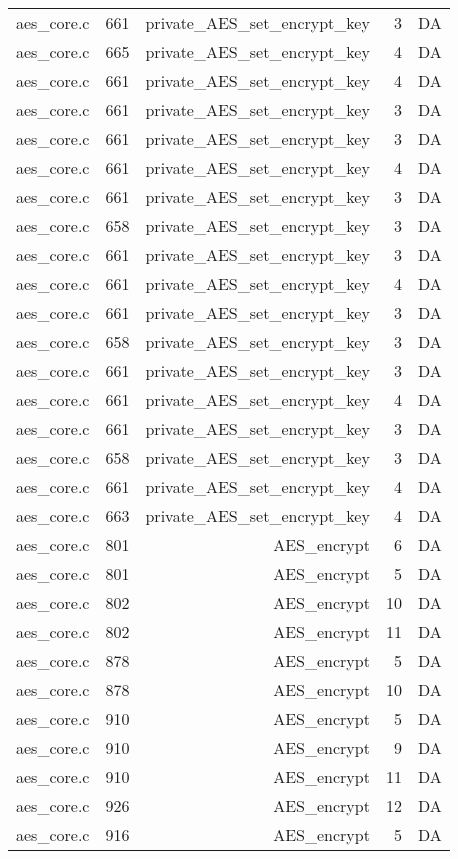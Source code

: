 \begin{table}
\begin{tabular}{clrrr}
aes\_core.c& 661&private\_AES\_set\_encrypt\_key&3 &DA\\
aes\_core.c& 665&private\_AES\_set\_encrypt\_key&4 &DA\\
aes\_core.c& 661&private\_AES\_set\_encrypt\_key&4 &DA\\
aes\_core.c& 661&private\_AES\_set\_encrypt\_key&3 &DA\\
aes\_core.c& 661&private\_AES\_set\_encrypt\_key&3 &DA\\
aes\_core.c& 661&private\_AES\_set\_encrypt\_key&4 &DA\\
aes\_core.c& 661&private\_AES\_set\_encrypt\_key&3 &DA\\
aes\_core.c& 658&private\_AES\_set\_encrypt\_key&3 &DA\\
aes\_core.c& 661&private\_AES\_set\_encrypt\_key&3 &DA\\
aes\_core.c& 661&private\_AES\_set\_encrypt\_key&4 &DA\\
aes\_core.c& 661&private\_AES\_set\_encrypt\_key&3 &DA\\
aes\_core.c& 658&private\_AES\_set\_encrypt\_key&3 &DA\\
aes\_core.c& 661&private\_AES\_set\_encrypt\_key&3 &DA\\
aes\_core.c& 661&private\_AES\_set\_encrypt\_key&4 &DA\\
aes\_core.c& 661&private\_AES\_set\_encrypt\_key&3 &DA\\
aes\_core.c& 658&private\_AES\_set\_encrypt\_key&3 &DA\\
aes\_core.c& 661&private\_AES\_set\_encrypt\_key&4 &DA\\
aes\_core.c& 663&private\_AES\_set\_encrypt\_key&4 &DA\\
aes\_core.c& 801&AES\_encrypt&6 &DA\\
aes\_core.c& 801&AES\_encrypt&5 &DA\\
aes\_core.c& 802&AES\_encrypt&10&DA\\
aes\_core.c& 802&AES\_encrypt&11&DA\\
aes\_core.c& 878&AES\_encrypt&5 &DA\\
aes\_core.c& 878&AES\_encrypt&10&DA\\
aes\_core.c& 910&AES\_encrypt&5 &DA\\
aes\_core.c& 910&AES\_encrypt&9 &DA\\
aes\_core.c& 910&AES\_encrypt&11&DA\\
aes\_core.c& 926&AES\_encrypt&12&DA\\
aes\_core.c& 916&AES\_encrypt&5 &DA\\

\end{tabular}
\end{table}
